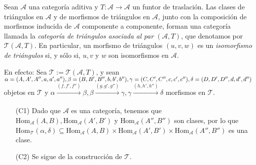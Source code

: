 \documentclass[tesis]{subfiles}
\begin{document}
\begin{Obs}\label{Mendoza_CT-Ejer.1}
    Sean $\mathscr{A}$ una categoría aditiva y $T:\mathscr{A}\to \mathscr{A}$ un funtor de traslación. Las clases de triángulos en $\mathscr{A}$ y de morfismos de triángulos en $\mathscr{A}$, junto con la composición de morfismos inducida de $\mathscr{A}$ componente a componente, forman una categoría llamada la \emph{categoría de triángulos asociada al par} $(\mathscr{A},T)$, que denotamos por $\mathscr{T}(\mathscr{A},T)$. En particular, un morfismo de triángulos $(u,v,w)$ es un \emph{isomorfismo de triángulos} si, y sólo si, $u,v$ y $w$ son isomorfismos en $\mathscr{A}$.
    \vspace{1mm}

    En efecto: Sea $\mathscr{T} := \mathscr{T}(\mathscr{A},T)$, y sean $\alpha=(A,A',A'',a,a',a''), \beta=(B,B',B'',b,b',b''), \gamma=(C,C',C'',\break c,c',c'') , \delta=(D,D',D'',d,d',d'')$ objetos en $\mathscr{T}$ y $\alpha\xrightarrow[]{(f,f',f'')}\beta, \beta\xrightarrow[]{(g,g',g'')}\gamma, \gamma\xrightarrow[]{(h,h',h'')}\delta$ morfismos en $\mathscr{T}$.
        
        \begin{enumerate}
            \item[(C1)] Dado que $\mathscr{A}$ es una categoría, tenemos que $\text{Hom}_\mathscr{A}(A,B), \text{Hom}_\mathscr{A}(A',B')$ y $\text{Hom}_\mathscr{A}(A'',B'')$ son clases, por lo que $\text{Hom}_\mathscr{T}(\alpha,\delta)\subseteq\text{Hom}_\mathscr{A}(A,B)\times\text{Hom}_\mathscr{A}(A',B')\times\text{Hom}_\mathscr{A}(A'',B'')$ es una clase.
            
            \item[(C2)] Se sigue de la construcción de $\mathscr{T}$.
            

\end{enumerate}
\end{Obs}
\end{document}
